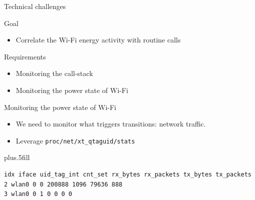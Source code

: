 \begin{frame}{Technical challenges}
\begin{block}{Goal}
\begin{itemize}
\item \alert{Correlate} the Wi-Fi energy activity with routine calls
\end{itemize}
\end{block}
\begin{block}{Requirements}
\begin{itemize}
\item Monitoring the call-stack
\item Monitoring the power state of Wi-Fi
\end{itemize}
\end{block}
\end{frame}
%
%
\begin{frame}[fragile]{Monitoring the power state of Wi-Fi}
\begin{itemize}
\item We need to monitor what triggers transitions: \alert{network traffic}.
\item Leverage \texttt{proc/net/xt\_qtaguid/stats}
\end{itemize}
\vskip0pt plus.5fill
\begin{lstlisting}
idx iface uid_tag_int cnt_set rx_bytes rx_packets tx_bytes tx_packets
2 wlan0 0 0 200888 1096 79636 888
3 wlan0 0 1 0 0 0 0
\end{lstlisting}
\end{frame}
%
%

